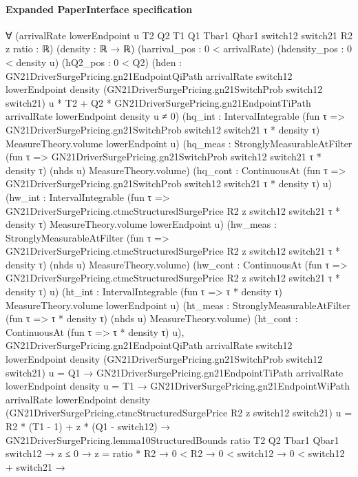 \documentclass[10pt]{article}
\begin{document}
\paragraph{Expanded PaperInterface specification}
\begin{ReviewVerbatim}
∀ (arrivalRate lowerEndpoint u T2 Q2 T1 Q1 Tbar1 Qbar1 switch12 switch21 R2 z ratio : ℝ) (density : ℝ → ℝ)
  (harrival_pos : 0 < arrivalRate) (hdensity_pos : 0 < density u) (hQ2_pos : 0 < Q2)
  (hden :
    GN21DriverSurgePricing.gn21EndpointQiPath arrivalRate switch12 lowerEndpoint density
            (GN21DriverSurgePricing.gn21SwitchProb switch12 switch21) u *
          T2 +
        Q2 * GN21DriverSurgePricing.gn21EndpointTiPath arrivalRate lowerEndpoint density u ≠
      0)
  (hq_int :
    IntervalIntegrable (fun τ => GN21DriverSurgePricing.gn21SwitchProb switch12 switch21 τ * density τ)
      MeasureTheory.volume lowerEndpoint u)
  (hq_meas :
    StronglyMeasurableAtFilter (fun τ => GN21DriverSurgePricing.gn21SwitchProb switch12 switch21 τ * density τ) (nhds u)
      MeasureTheory.volume)
  (hq_cont : ContinuousAt (fun τ => GN21DriverSurgePricing.gn21SwitchProb switch12 switch21 τ * density τ) u)
  (hw_int :
    IntervalIntegrable (fun τ => GN21DriverSurgePricing.ctmcStructuredSurgePrice R2 z switch12 switch21 τ * density τ)
      MeasureTheory.volume lowerEndpoint u)
  (hw_meas :
    StronglyMeasurableAtFilter
      (fun τ => GN21DriverSurgePricing.ctmcStructuredSurgePrice R2 z switch12 switch21 τ * density τ) (nhds u)
      MeasureTheory.volume)
  (hw_cont :
    ContinuousAt (fun τ => GN21DriverSurgePricing.ctmcStructuredSurgePrice R2 z switch12 switch21 τ * density τ) u)
  (ht_int : IntervalIntegrable (fun τ => τ * density τ) MeasureTheory.volume lowerEndpoint u)
  (ht_meas : StronglyMeasurableAtFilter (fun τ => τ * density τ) (nhds u) MeasureTheory.volume)
  (ht_cont : ContinuousAt (fun τ => τ * density τ) u),
  GN21DriverSurgePricing.gn21EndpointQiPath arrivalRate switch12 lowerEndpoint density
        (GN21DriverSurgePricing.gn21SwitchProb switch12 switch21) u =
      Q1 →
    GN21DriverSurgePricing.gn21EndpointTiPath arrivalRate lowerEndpoint density u = T1 →
      GN21DriverSurgePricing.gn21EndpointWiPath arrivalRate lowerEndpoint density
            (GN21DriverSurgePricing.ctmcStructuredSurgePrice R2 z switch12 switch21) u =
          R2 * (T1 - 1) + z * (Q1 - switch12) →
        GN21DriverSurgePricing.lemma10StructuredBounds ratio T2 Q2 Tbar1 Qbar1 switch12 →
          z ≤ 0 →
            z = ratio * R2 →
              0 < R2 →
                0 < switch12 →
                  0 < switch12 + switch21 →

\end{ReviewVerbatim}
\end{document}
